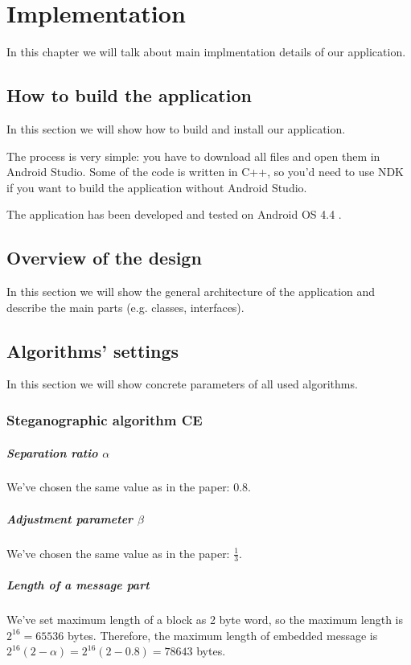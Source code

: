 \chapter{Implementation}

In this chapter we will talk about main implmentation details of
our application.

\section{How to build the application}
In this section we will show how to build and install our application.

The process is very simple: you have to download all files and open them
in Android Studio. Some of the code is written in C++, so you'd need to 
use NDK if you want to build the application without Android Studio.

The application has been developed and tested on Android OS 4.4 .

\section{Overview of the design}
In this section we will show the general architecture of the application
and describe the main parts (e.g. classes, interfaces).

\TODO 


\section{Algorithms' settings}
In this section we will show concrete parameters of all used algorithms.

\subsection{Steganographic algorithm CE}

\paragraph{Separation ratio $\alpha$} We've chosen the same value as in the 
paper: $0.8$.
\paragraph{Adjustment parameter $\beta$} We've chosen the same value as in the paper: $\frac{1}{3}$.
\paragraph{Length of a message part}
We've set maximum length of a block as 2 byte word, so the maximum length is 
$2^{16} = 65536$ bytes. Therefore, the maximum length of embedded message is 
$2^{16} (2 - \alpha) = 2^{16} (2 - 0.8) = 78643$ bytes.

